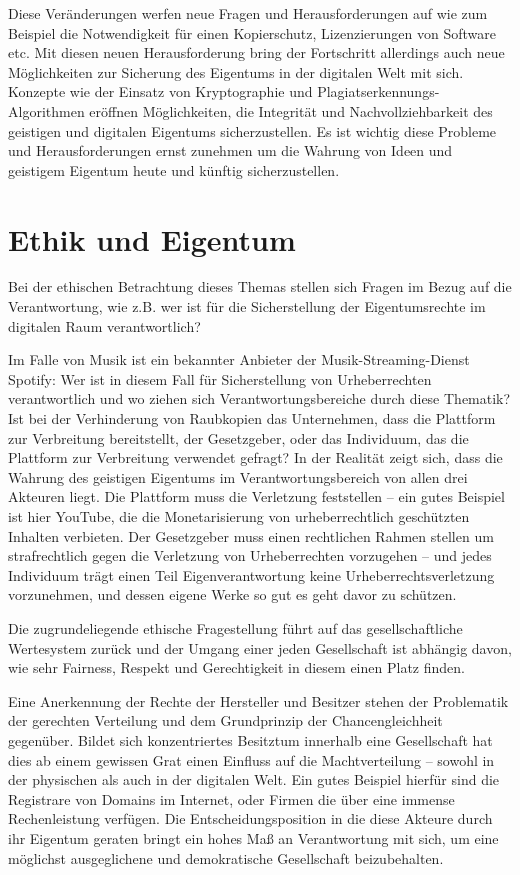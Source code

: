 \documentclass[journal]{IEEEtran}
\begin{document}
\begin{onecolumn}
Diese Veränderungen werfen neue Fragen und Herausforderungen auf wie zum Beispiel 
die Notwendigkeit für einen Kopierschutz, Lizenzierungen von Software etc.
Mit diesen neuen Herausforderung bring der Fortschritt allerdings auch 
neue Möglichkeiten zur Sicherung des Eigentums in der digitalen Welt mit sich.
Konzepte wie der Einsatz von Kryptographie und Plagiatserkennungs-Algorithmen 
eröffnen Möglichkeiten, die Integrität und Nachvollziehbarkeit des geistigen und 
digitalen Eigentums sicherzustellen.
Es ist wichtig diese Probleme und Herausforderungen ernst zunehmen um die Wahrung von 
Ideen und geistigem Eigentum heute und künftig sicherzustellen. 

\section*{Ethik und Eigentum}

Bei der ethischen Betrachtung dieses Themas stellen sich Fragen im Bezug auf die 
Verantwortung, wie z.B. wer ist für die Sicherstellung der Eigentumsrechte im digitalen 
Raum verantwortlich?

Im Falle von Musik ist ein bekannter Anbieter der Musik-Streaming-Dienst Spotify: Wer ist 
in diesem Fall für Sicherstellung von Urheberrechten verantwortlich und wo ziehen sich 
Verantwortungsbereiche durch diese Thematik? Ist bei der Verhinderung von Raubkopien 
das Unternehmen, dass die Plattform zur Verbreitung bereitstellt, der Gesetzgeber, oder 
das Individuum, das die Plattform zur Verbreitung verwendet gefragt? In der Realität zeigt 
sich, dass die Wahrung des geistigen Eigentums im Verantwortungsbereich von allen drei 
Akteuren liegt. Die Plattform muss die Verletzung feststellen – ein gutes Beispiel ist 
hier YouTube, die die Monetarisierung von urheberrechtlich geschützten Inhalten verbieten. 
Der Gesetzgeber muss einen rechtlichen Rahmen stellen um strafrechtlich gegen die 
Verletzung von Urheberrechten vorzugehen – und jedes Individuum trägt einen Teil 
Eigenverantwortung keine Urheberrechtsverletzung vorzunehmen, und dessen eigene Werke 
so gut es geht davor zu schützen.

Die zugrundeliegende ethische Fragestellung führt auf das gesellschaftliche Wertesystem 
zurück und der Umgang einer jeden Gesellschaft ist abhängig davon, wie sehr Fairness, 
Respekt und Gerechtigkeit in diesem einen Platz finden.

Eine Anerkennung der Rechte der Hersteller und Besitzer stehen der Problematik der 
gerechten Verteilung und dem Grundprinzip der Chancengleichheit gegenüber. Bildet sich
konzentriertes Besitztum innerhalb eine Gesellschaft hat dies ab einem gewissen Grat
einen Einfluss auf die Machtverteilung – sowohl in der physischen als auch in der 
digitalen Welt. Ein gutes Beispiel hierfür sind die Registrare von Domains im Internet, 
oder Firmen die über eine immense Rechenleistung verfügen. Die Entscheidungsposition in
die diese Akteure durch ihr Eigentum geraten bringt ein hohes Maß an Verantwortung mit 
sich, um eine möglichst ausgeglichene und demokratische Gesellschaft beizubehalten.


\end{onecolumn}
\end{document}
